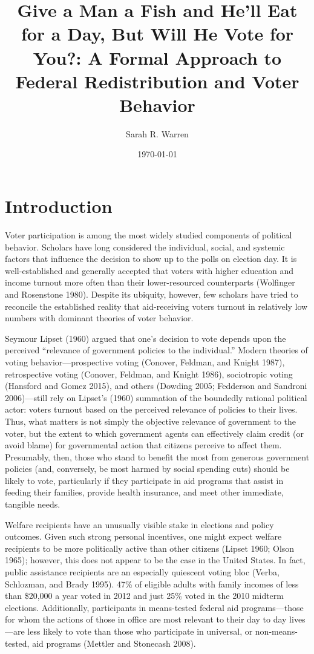 \documentclass[12pt]{paper}
\begin{document}
\title{Give a Man a Fish and He'll Eat for a Day, But Will He Vote for You?: A Formal Approach to Federal Redistribution and Voter Behavior}
\author{Sarah R. Warren}
\date{\today}
\maketitle

\section{Introduction}
Voter participation is among the most widely studied components of political behavior. Scholars have long considered the individual, social, and systemic factors that influence the decision to show up to the polls on election day. It is well-established and generally accepted that voters with higher education and income turnout more often than their lower-resourced counterparts (Wolfinger and Rosenstone 1980).  Despite its ubiquity, however, few scholars have tried to reconcile the established reality that aid-receiving voters turnout in relatively low numbers with dominant theories of voter behavior.

Seymour Lipset (1960) argued that one's decision to vote depends upon the perceived “relevance of government policies to the individual.” Modern theories of voting behavior—prospective voting (Conover, Feldman, and Knight 1987), retrospective voting (Conover, Feldman, and Knight 1986), sociotropic voting (Hansford and Gomez 2015), and others (Dowding 2005; Fedderson and Sandroni 2006)—still rely on Lipset’s (1960) summation of the boundedly rational political actor: voters turnout based on the perceived relevance of policies to their lives. Thus, what matters is not simply the objective relevance of government to the voter, but the extent to which government agents can effectively claim credit (or avoid blame) for governmental action that citizens perceive to affect them. Presumably, then, those who stand to benefit the most from generous government policies (and, conversely, be most harmed by social spending cuts) should be likely to vote, particularly if they participate in aid programs that assist in feeding their families, provide health insurance, and meet other immediate, tangible needs.

Welfare recipients have an unusually visible stake in elections and policy outcomes. Given such strong personal incentives, one might expect welfare recipients to be more politically active than other citizens (Lipset 1960; Olson 1965); however, this does not appear to be the case in the United States. In fact, public assistance recipients are an especially quiescent voting bloc (Verba, Schlozman, and Brady 1995). 47\% of eligible adults with family incomes of less than \$20,000 a year voted in 2012 and just 25\% voted in the 2010 midterm elections. Additionally, participants in means-tested federal aid programs—those for whom the actions of those in office are most relevant to their day to day lives—are less likely to vote than those who participate in universal, or non-means-tested, aid programs (Mettler and Stonecash 2008).  
\end{document}
